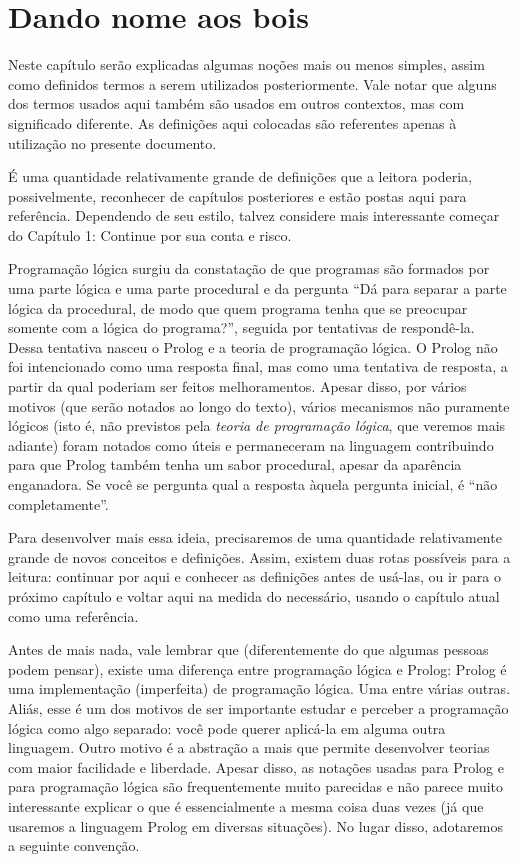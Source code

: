 \documentclass{article}
\theoremstyle{remark}
\begin{document}
\section{Dando nome aos bois}

Neste capítulo serão explicadas algumas noções mais ou menos simples, assim como definidos termos a serem utilizados posteriormente. Vale notar que alguns dos termos usados aqui também são usados em outros contextos, mas com significado diferente. As definições aqui colocadas são referentes apenas à utilização no presente documento.\par
É uma quantidade relativamente grande de definições que a leitora poderia, possivelmente, reconhecer de capítulos posteriores e estão postas aqui para referência. Dependendo de seu estilo, talvez considere mais interessante começar do Capítulo 1: Continue por sua conta e risco. %

Programação lógica surgiu da constatação de que programas são formados por uma parte lógica e uma parte procedural e da pergunta ``Dá para separar a parte lógica da procedural, de modo que quem programa tenha que se preocupar somente com a lógica do programa?'', seguida por tentativas de respondê-la. Dessa tentativa nasceu o Prolog e a teoria de programação lógica. O Prolog não foi intencionado %
como uma resposta final, mas como uma tentativa de resposta, a partir da qual poderiam ser feitos
melhoramentos. Apesar disso, por vários motivos (que serão notados ao longo do texto), vários mecanismos não puramente lógicos (isto é, não previstos pela \textit{teoria de programação lógica}, que veremos mais adiante) foram notados como úteis e permaneceram na linguagem contribuindo para que Prolog também tenha um sabor procedural, apesar da aparência enganadora. Se você se pergunta qual a resposta àquela pergunta inicial, é ``não completamente''.\par

Para desenvolver mais essa ideia, precisaremos de uma quantidade relativamente grande de novos conceitos e definições. Assim, existem duas rotas possíveis para a leitura: continuar por aqui e conhecer as definições antes de usá-las, ou ir para o próximo capítulo e voltar aqui na medida do necessário, usando o capítulo atual como uma referência.


Antes de mais nada, vale lembrar que (diferentemente do que algumas pessoas podem pensar), existe uma diferença entre programação lógica e Prolog: Prolog é uma implementação (imperfeita) de programação lógica. Uma entre várias outras. Aliás, esse é um dos motivos de ser importante estudar e perceber a programação lógica como algo separado: você pode querer aplicá-la em alguma outra linguagem. Outro motivo é a abstração a mais que permite desenvolver teorias com maior facilidade e liberdade. Apesar
disso, as notações usadas para Prolog e para programação lógica são frequentemente muito parecidas e não parece muito interessante explicar o que é essencialmente a mesma coisa duas vezes (já que usaremos a linguagem Prolog em diversas situações). No lugar disso, adotaremos a seguinte convenção.
\end{document}
